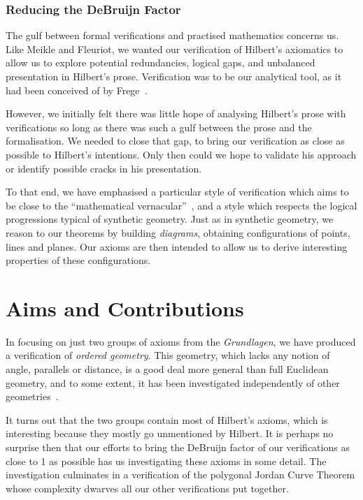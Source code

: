 \subsubsection{Reducing the DeBruijn Factor}
The gulf between formal verifications and practised mathematics concerns us. Like Meikle and Fleuriot, we wanted our verification of Hilbert's axiomatics to allow us to explore potential redundancies, logical gaps, and unbalanced presentation in Hilbert's prose. Verification was to be our analytical tool, as it had been conceived of by Frege~\cite{ProofsAboutProofs}.

However, we initially felt there was little hope of analysing Hilbert's prose with verifications so long as there was such a gulf between the prose and the formalisation. We needed to close that gap, to bring our verification as close as possible to Hilbert's intentions. Only then could we hope to validate his approach or identify possible cracks in his presentation.

To that end, we have emphasised a particular style of verification which aims to be close to the ``mathematical vernacular''~\cite{MizarMathematicalVernacular}, and a style which respects the logical progressions typical of synthetic geometry. Just as in synthetic geometry, we reason to our theorems by building \emph{diagrams}, obtaining configurations of points, lines and planes. Our axioms are then intended to allow us to derive interesting properties of these configurations.

\section{Aims and Contributions}
In focusing on just two groups of axioms from the \emph{Grundlagen}, we have produced a verification of \emph{ordered geometry}. This geometry, which lacks any notion of angle, parallels or distance, is a good deal more general than full Euclidean geometry, and to some extent, it has been investigated independently of other geometries~\cite{AxiomaticsOrderedGeometry}.

It turns out that the two groups contain most of Hilbert's axioms, which is interesting because they mostly go unmentioned by Hilbert. It is perhaps no surprise then that our efforts to bring the DeBruijn factor of our verifications as close to 1 as possible has us investigating these axioms in some detail. The investigation culminates in a verification of the polygonal Jordan Curve Theorem whose complexity dwarves all our other verifications put together.

